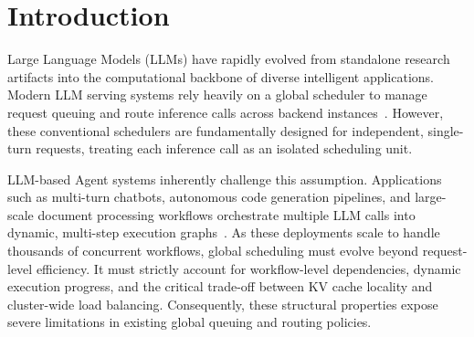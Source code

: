 \documentclass[sigconf,review,anonymous]{acmart}
\begin{document}



\maketitle

\section{Introduction}

Large Language Models (LLMs) have rapidly evolved from standalone research artifacts into 
the computational backbone of diverse intelligent applications. Modern LLM serving systems 
rely heavily on a global scheduler to manage request queuing and route inference calls across 
backend instances~\cite{kwon2023efficient,yu2022orca}. However, these conventional schedulers 
are fundamentally designed for independent, single-turn requests, treating each inference call 
as an isolated scheduling unit.

LLM-based Agent systems inherently challenge this assumption. Applications such as multi-turn 
chatbots, autonomous code generation pipelines, and large-scale document processing workflows 
orchestrate multiple LLM calls into dynamic, multi-step execution graphs~\cite{yao2022react}. 
As these deployments scale to handle thousands of concurrent workflows, global scheduling 
must evolve beyond request-level efficiency. It must strictly account for workflow-level dependencies, 
dynamic execution progress, and the critical trade-off between KV cache locality and cluster-wide load 
balancing. Consequently, these structural properties expose severe limitations in existing global queuing 
and routing policies.
\end{document}
